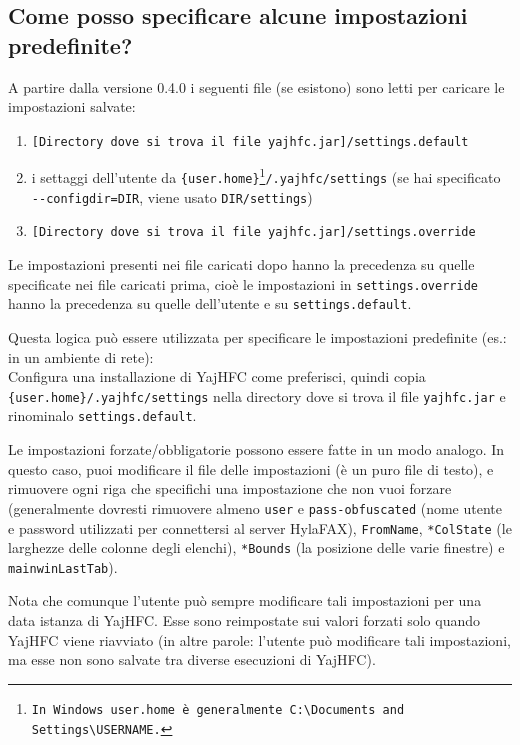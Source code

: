 \documentclass[a4paper,10pt]{scrartcl}
\begin{document}
\subsection{Come posso specificare alcune impostazioni predefinite?}

A partire dalla versione 0.4.0 i seguenti file (se esistono) sono letti per caricare le impostazioni salvate:
\begin{enumerate}
 \item \texttt{[Directory dove si trova il file yajhfc.jar]/settings.default}
 \item i settaggi dell'utente da \texttt{\{user.home\}\footnote{In Windows \texttt{user.home} è generalmente \texttt{C:\textbackslash Documents and Settings\textbackslash USERNAME}.}/.yajhfc/settings} (se hai specificato \texttt{-{-}configdir=DIR}, viene usato \texttt{DIR/settings})
 \item \texttt{[Directory dove si trova il file yajhfc.jar]/settings.override}
\end{enumerate}

Le impostazioni presenti nei file caricati dopo hanno la precedenza su quelle specificate nei file caricati prima, cioè le impostazioni in \texttt{settings.override} hanno la precedenza su quelle dell'utente e su \texttt{settings.default}.
\medskip

Questa logica può essere utilizzata per specificare le impostazioni predefinite (es.: in un ambiente di rete): \\
Configura una installazione di YajHFC come preferisci, quindi copia \texttt{\{user.home\}/.yajhfc/settings} nella directory dove si trova il file \texttt{yajhfc.jar} e rinominalo \texttt{settings.default}.
\medskip

Le impostazioni forzate/obbligatorie possono essere fatte in un modo analogo. In questo caso, puoi modificare il file delle impostazioni (è un puro file di testo), e rimuovere ogni riga che specifichi una impostazione che non vuoi forzare (generalmente dovresti rimuovere almeno \texttt{user} e \texttt{pass-obfuscated} (nome utente e password utilizzati per connettersi al server HylaFAX), \texttt{FromName}, \texttt{*ColState} (le larghezze delle colonne degli elenchi), \texttt{*Bounds} (la posizione delle varie finestre) e \texttt{mainwinLastTab}).

Nota che comunque l'utente può sempre modificare tali impostazioni per una data istanza di YajHFC. Esse sono reimpostate sui valori forzati solo quando YajHFC viene riavviato (in altre parole: l'utente può modificare tali impostazioni, ma esse non sono salvate tra diverse esecuzioni di YajHFC).
\end{document}
